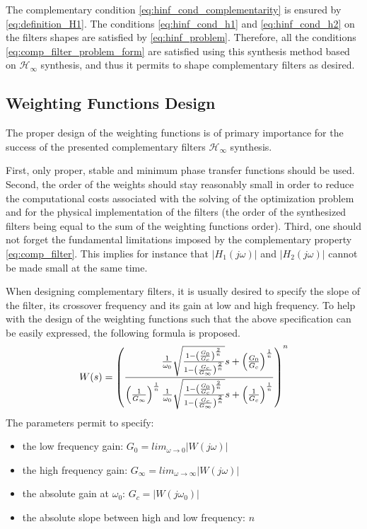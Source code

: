 \documentclass[conference]{IEEEtran}
\begin{document}
The complementary condition \eqref{eq:hinf_cond_complementarity} is ensured by \eqref{eq:definition_H1}.
The conditions \eqref{eq:hinf_cond_h1} and \eqref{eq:hinf_cond_h2} on the filters shapes are satisfied by \eqref{eq:hinf_problem}.
Therefore, all the conditions \eqref{eq:comp_filter_problem_form} are satisfied using this synthesis method based on \(\mathcal{H}_\infty\) synthesis, and thus it permits to shape complementary filters as desired.

\subsection{Weighting Functions Design}
\label{sec:orgfe75ec2}
\label{sec:hinf_weighting_func}
The proper design of the weighting functions is of primary importance for the success of the presented complementary filters \(\mathcal{H}_\infty\) synthesis.

First, only proper, stable and minimum phase transfer functions should be used.
Second, the order of the weights should stay reasonably small in order to reduce the computational costs associated with the solving of the optimization problem and for the physical implementation of the filters (the order of the synthesized filters being equal to the sum of the weighting functions order).
Third, one should not forget the fundamental limitations imposed by the complementary property \eqref{eq:comp_filter}.
This implies for instance that \(|H_1(j\omega)|\) and \(|H_2(j\omega)|\) cannot be made small at the same time.

When designing complementary filters, it is usually desired to specify the slope of the filter, its crossover frequency and its gain at low and high frequency.
To help with the design of the weighting functions such that the above specification can be easily expressed, the following formula is proposed.
\begin{equation}
\label{eq:weight_formula}
  W(s) = \left( \frac{
           \hfill{} \frac{1}{\omega_0} \sqrt{\frac{1 - \left(\frac{G_0}{G_c}\right)^{\frac{2}{n}}}{1 - \left(\frac{G_c}{G_\infty}\right)^{\frac{2}{n}}}} s + \left(\frac{G_0}{G_c}\right)^{\frac{1}{n}}
         }{
           \left(\frac{1}{G_\infty}\right)^{\frac{1}{n}} \frac{1}{\omega_0} \sqrt{\frac{1 - \left(\frac{G_0}{G_c}\right)^{\frac{2}{n}}}{1 - \left(\frac{G_c}{G_\infty}\right)^{\frac{2}{n}}}} s + \left(\frac{1}{G_c}\right)^{\frac{1}{n}}
         }\right)^n
\end{equation}
The parameters permit to specify:
\begin{itemize}
\item the low frequency gain: \(G_0 = lim_{\omega \to 0} |W(j\omega)|\)
\item the high frequency gain: \(G_\infty = lim_{\omega \to \infty} |W(j\omega)|\)
\item the absolute gain at \(\omega_0\): \(G_c = |W(j\omega_0)|\)
\item the absolute slope between high and low frequency: \(n\)
\end{itemize}
\end{document}
